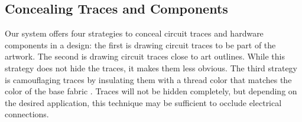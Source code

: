 \documentclass[header.tex]{subfiles}
\begin{document}



 

\subsection{Concealing Traces and Components}
Our system offers four strategies to conceal circuit traces and hardware components in a design: the first is drawing circuit traces to be part of the artwork. The second is drawing circuit traces close to art outlines. 
While this strategy does not hide the traces, it makes them less obvious. 
The third strategy is camouflaging traces by insulating them with a thread color that matches the color of the base fabric \cite{Buechley2009}. Traces will not be hidden completely, but depending on the desired application, this technique may be sufficient to occlude electrical connections. 
\end{document}
